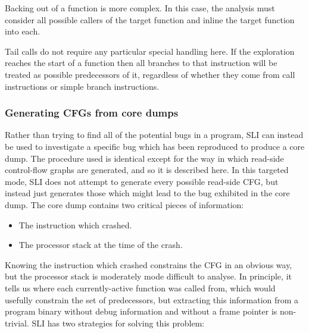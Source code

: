 Backing out of a function is more complex.  In this case, the analysis
must consider all possible callers of the target function and inline
the target function into each.  


Tail calls do not require any particular special handling here.  If
the exploration reaches the start of a function then all branches to
that instruction will be treated as possible predecessors of it,
regardless of whether they come from call instructions or simple
branch instructions.

\subsubsection{Generating CFGs from core dumps}

Rather than trying to find all of the potential bugs in a program, SLI
can instead be used to investigate a specific bug which has been
reproduced to produce a core dump.  The procedure used is identical
except for the way in which read-side control-flow graphs are
generated, and so it is described here.  In this targeted mode, SLI
does not attempt to generate every possible read-side CFG, but instead
just generates those which might lead to the bug exhibited in the core
dump.  The core dump contains two critical pieces of information:

\begin{itemize}
\item
  The instruction which crashed.
\item
  The processor stack at the time of the crash.
\end{itemize}

Knowing the instruction which crashed constrains the CFG in an obvious
way, but the processor stack is moderately mode difficult to analyse.
In principle, it tells us where each currently-active function was
called from, which would usefully constrain the set of predecessors,
but extracting this information from a program binary without debug
information and without a frame pointer is non-trivial.  SLI has two
strategies for solving this problem:

